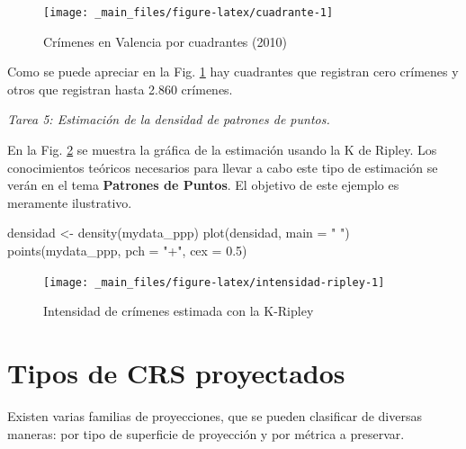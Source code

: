 \documentclass[
]{book}
\newenvironment{Shaded}{\begin{snugshade}}{\end{snugshade}}
\newcommand{\AttributeTok}[1]{\textcolor[rgb]{0.77,0.63,0.00}{#1}}
\newcommand{\FloatTok}[1]{\textcolor[rgb]{0.00,0.00,0.81}{#1}}
\newcommand{\FunctionTok}[1]{\textcolor[rgb]{0.00,0.00,0.00}{#1}}
\newcommand{\NormalTok}[1]{#1}
\newcommand{\OtherTok}[1]{\textcolor[rgb]{0.56,0.35,0.01}{#1}}
\newcommand{\StringTok}[1]{\textcolor[rgb]{0.31,0.60,0.02}{#1}}
\begin{document}
\begin{figure}

{\centering \texttt{[image: \_main\_files/figure-latex/cuadrante-1]} 

}

\caption{Crímenes en Valencia por cuadrantes (2010)}\label{fig:cuadrante}
\end{figure}

Como se puede apreciar en la Fig. \ref{fig:cuadrante} hay cuadrantes que
registran cero crímenes y otros que registran hasta 2.860 crímenes.

\emph{Tarea 5: Estimación de la densidad de patrones de puntos.}

En la Fig. \ref{fig:intensidad-ripley} se muestra la gráfica de la estimación
usando la K de Ripley. Los conocimientos teóricos necesarios para llevar a cabo
este tipo de estimación se verán en el tema \textbf{Patrones de Puntos}. El objetivo
de este ejemplo es meramente ilustrativo.

\begin{Shaded}
\begin{Highlighting}[]
\NormalTok{densidad }\OtherTok{\textless{}{-}} \FunctionTok{density}\NormalTok{(mydata\_ppp)}
\FunctionTok{plot}\NormalTok{(densidad, }\AttributeTok{main =} \StringTok{" "}\NormalTok{)}
\FunctionTok{points}\NormalTok{(mydata\_ppp, }\AttributeTok{pch =} \StringTok{"+"}\NormalTok{, }\AttributeTok{cex =} \FloatTok{0.5}\NormalTok{)}
\end{Highlighting}
\end{Shaded}

\begin{figure}

{\centering \texttt{[image: \_main\_files/figure-latex/intensidad-ripley-1]} 

}

\caption{Intensidad de crímenes estimada con la K-Ripley}\label{fig:intensidad-ripley}
\end{figure}

\hypertarget{appendix-anexo}{%
\appendix}


\hypertarget{crsproy}{%
\chapter{Tipos de CRS proyectados}\label{crsproy}}

Existen varias familias de proyecciones, que se pueden clasificar de diversas
maneras: por tipo de superficie de proyección y por métrica a preservar.
\end{document}
